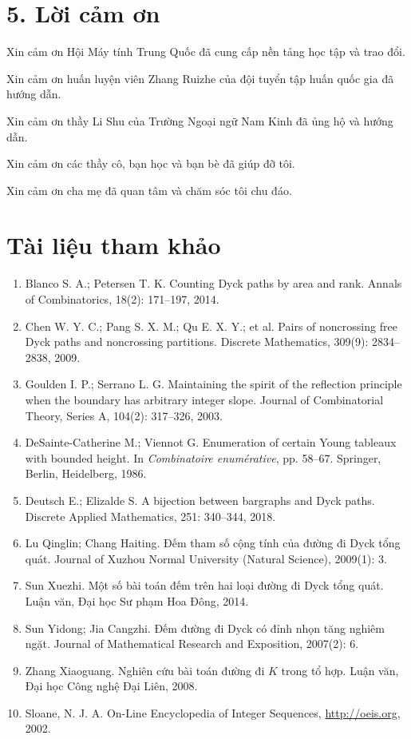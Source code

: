 \documentclass[11pt]{article}
\begin{document}
\section*{5. Lời cảm ơn}

Xin cảm ơn Hội Máy tính Trung Quốc đã cung cấp nền tảng học tập và trao đổi.

Xin cảm ơn huấn luyện viên Zhang Ruizhe của đội tuyển tập huấn quốc gia đã
hướng dẫn.

Xin cảm ơn thầy Li Shu của Trường Ngoại ngữ Nam Kinh đã ủng hộ và hướng dẫn.

Xin cảm ơn các thầy cô, bạn học và bạn bè đã giúp đỡ tôi.

Xin cảm ơn cha mẹ đã quan tâm và chăm sóc tôi chu đáo.

\section*{Tài liệu tham khảo}

\begin{enumerate}
  \item Blanco S. A.; Petersen T. K. Counting Dyck paths by area and rank.
        Annals of Combinatorics, 18(2): 171--197, 2014.
  \item Chen W. Y. C.; Pang S. X. M.; Qu E. X. Y.; et al. Pairs of noncrossing
        free Dyck paths and noncrossing partitions. Discrete Mathematics,
        309(9): 2834--2838, 2009.
  \item Goulden I. P.; Serrano L. G. Maintaining the spirit of the reflection
        principle when the boundary has arbitrary integer slope. Journal of
        Combinatorial Theory, Series A, 104(2): 317--326, 2003.
  \item DeSainte-Catherine M.; Viennot G. Enumeration of certain Young tableaux
        with bounded height. In \emph{Combinatoire enumérative}, pp. 58--67.
        Springer, Berlin, Heidelberg, 1986.
  \item Deutsch E.; Elizalde S. A bijection between bargraphs and Dyck paths.
        Discrete Applied Mathematics, 251: 340--344, 2018.
  \item Lu Qinglin; Chang Haiting. Đếm tham số cộng tính của đường đi Dyck
        tổng quát. Journal of Xuzhou Normal University (Natural Science),
        2009(1): 3.
  \item Sun Xuezhi. Một số bài toán đếm trên hai loại đường đi Dyck tổng quát.
        Luận văn, Đại học Sư phạm Hoa Đông, 2014.
  \item Sun Yidong; Jia Cangzhi. Đếm đường đi Dyck có đỉnh nhọn tăng nghiêm
        ngặt. Journal of Mathematical Research and Exposition, 2007(2): 6.
  \item Zhang Xiaoguang. Nghiên cứu bài toán đường đi \(K\) trong tổ hợp.
        Luận văn, Đại học Công nghệ Đại Liên, 2008.
  \item Sloane, N. J. A. On-Line Encyclopedia of Integer Sequences,
        \url{http://oeis.org}, 2002.
\end{enumerate}
\end{document}
